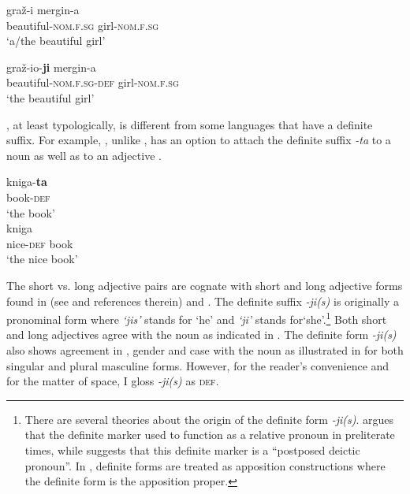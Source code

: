 \documentclass[output=paper,
modfonts
]{langscibook}
\begin{document}
\begin{exe}
\ex \label{ex:sereikaite:7}
\begin{xlist}
\ex \gll graž-i mergin-a \\
beautiful-\textsc{nom.f.sg} girl-\textsc{nom.f.sg}\\
\trans `a/the beautiful girl'

\ex \gll graž-io-\textbf{ji} mergin-a\\
beautiful-\textsc{nom.f.sg}-\textsc{def} girl-\textsc{nom.f.sg}\\
\trans `the beautiful girl' 
\end{xlist}
\end{exe}

, at least typologically, is different from some  languages that have a definite suffix. For example, , unlike , has an option to attach the definite suffix \textit{-ta} to a noun  as well as to an adjective .

\begin{exe}
\ex\label{ex:sereikaite:8} 
\begin{xlist}
\ex \label{ex:sereikaite:8a}
\gll kniga-\textbf{ta} \\
book-\textsc{def}\\
\trans `the book' \\
\ex \label{ex:sereikaite:8b}
 {kniga}\\
nice-\textsc{def} book\\
\trans `the nice book'  
\end{xlist}
\end{exe}

The  short vs. long adjective pairs are cognate with short and long adjective forms found in  (see \citealt{Aljovic2010} and references therein) and  \citep{Sereikaite2015}. The definite suffix \textit{-ji(s)} is originally a pronominal form \citep{Ulvydas1965,Stolz2008} where \textit{`jis'} stands for `he' and \textit{`ji'} stands for`she'.\footnote{There are several theories about the origin of the definite form \textit{-ji(s)}. \citet{Stolz2008} argues that the definite marker used to function as a relative pronoun in preliterate times, while \citet{Rosinas1988} suggests that this definite marker is a ``postposed deictic pronoun''. In \citet{Valeckiene1986}, definite forms are treated as apposition constructions where the definite form is the apposition proper.} Both short and long adjectives agree with the noun as indicated in . The definite form \textit{-ji(s)} also shows agreement in , gender and case with the noun as illustrated in  for both singular and plural masculine forms. However, for the reader's convenience and for the matter of space, I gloss \textit{-ji(s)} as \textsc{def}.
\end{document}
